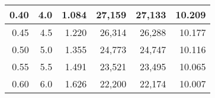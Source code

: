 \begin{longtable}{|r|r|r|r|r|r|}
			0.40                                                                                                   & 4.0                                                                                                   & 1.084                                                                                          & 27,159                                             & 27,133                                                    & 10.209                                            \\ \hline
			0.45                                                                                                   & 4.5                                                                                                   & 1.220                                                                                          & 26,314                                             & 26,288                                                    & 10.177                                            \\ \hline
			0.50                                                                                                   & 5.0                                                                                                   & 1.355                                                                                          & 24,773                                             & 24,747                                                    & 10.116                                            \\ \hline
			0.55                                                                                                   & 5.5                                                                                                   & 1.491                                                                                          & 23,521                                             & 23,495                                                    & 10.065                                            \\ \hline
			0.60                                                                                                   & 6.0                                                                                                   & 1.626                                                                                          & 22,200                                             & 22,174                                                    & 10.007                                            \\ \hline

\end{longtable}
